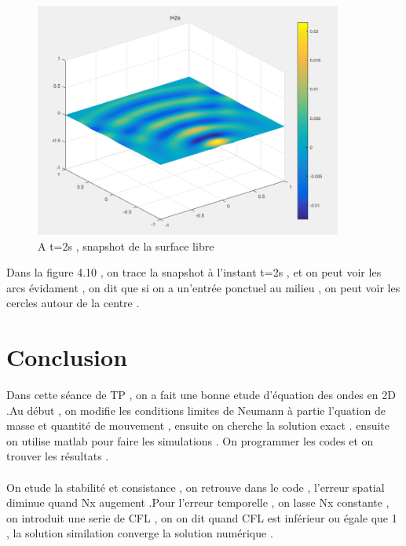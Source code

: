 \documentclass[a4paper,10pt]{report} %
\begin{document}
\begin{figure}[h]
\centering
\includegraphics[width=0.9\textwidth]{fig/figure3.png}
\caption{A t=2s , snapshot de la surface libre}
\end{figure}
\label{sss3}

Dans la figure 4.10 , on trace la snapshot à l'instant t=2s , et on peut voir les arcs  évidament , on dit que si on a un'entrée ponctuel au milieu , on peut voir les cercles autour de la centre .
\chapter{Conclusion} 
Dans cette séance de TP , on a fait une bonne etude d'équation des ondes en 2D .Au début , on modifie les conditions limites de Neumann à partie l'quation de masse et quantité de mouvement , ensuite on cherche la solution exact . ensuite on utilise matlab pour faire les simulations  . On programmer les codes et on trouver les résultats . \\\\
On etude la stabilité et consistance ,  on retrouve dans le code , l'erreur spatial diminue quand Nx augement .Pour l'erreur temporelle , on lasse Nx constante , on introduit une serie de CFL , on on dit quand CFL est inférieur ou égale que 1 , la solution similation converge la solution numérique .\\\\
\end{document}
